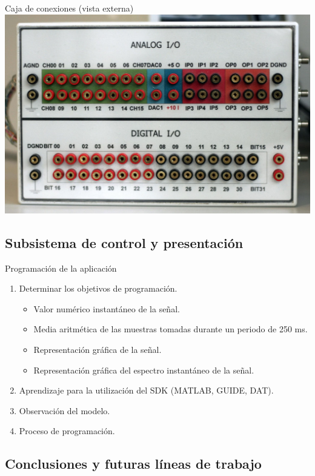 \documentclass[utf8, compress]			{beamer}
\begin{document}
\begin{frame}{Caja de conexiones (vista externa)}
    \includegraphics{exterior.jpg}
\end{frame}


\subsection{Subsistema de control y presentación}

\begin{frame}{Programación de la aplicación}
    \begin{enumerate}
	\item Determinar los objetivos de programación.
	    \begin{itemize}
		\item Valor numérico instantáneo de la señal.
		\item Media aritmética de las muestras tomadas durante un
		    periodo de 250 ms.
		\item Representación gráfica de la señal.
		\item Representación gráfica del espectro instantáneo de la
		    señal.
	    \end{itemize}
	\item Aprendizaje para la utilización del SDK (MATLAB, GUIDE, DAT).
	\item Observación del modelo.
	\item Proceso de programación.
    \end{enumerate}
\end{frame}


\subsection{Conclusiones y futuras líneas de trabajo}
\end{document}
